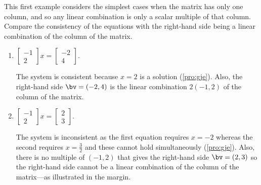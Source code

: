 \begin{example} \label{eg:}
This first example considers the simplest cases when the matrix has only one column, and so any linear combination is only a scalar multiple of that column.
Compare the consistency of the equations with the right-hand side being a linear combination of the column of the matrix.
\begin{enumerate}
\item \(\begin{bmatrix} -1\\2 \end{bmatrix}x
=\begin{bmatrix} -2\\4 \end{bmatrix}\).
\begin{solution} 
The system is consistent because \(x=2\) is a solution (\autoref{pro:gje}).
Also, the right-hand side \(\bv=(-2,4)\) is the linear combination \(2(-1,2)\) of the column of the matrix.
\end{solution}

\item \(\begin{bmatrix} -1\\2 \end{bmatrix}x
=\begin{bmatrix} 2\\3 \end{bmatrix}\).
\begin{solution} 
The system is inconsistent as the first equation requires \(x=-2\) whereas the second requires \(x=\tfrac32\) and these cannot hold simultaneously (\autoref{pro:gje}).
Also, there is no multiple of \((-1,2)\) that gives the right-hand side \(\bv=(2,3)\) so the right-hand side cannot be a linear combination of the column of the matrix---as illustrated in the margin.
\end{solution}


\end{enumerate}
\end{example}

